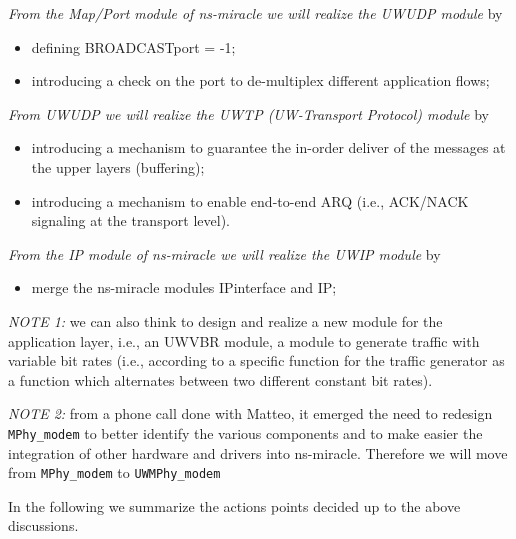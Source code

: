 \documentclass[11pt,journal,draftclsnofoot,onecolumn,twoside,letterpaper]{IEEEtran}
\theoremstyle{definition} \newtheorem{definition}[]{Definition}
\theoremstyle{theorem} \newtheorem{theorem}[]{Theorem}
\begin{document}
{\it From the Map/Port module of ns-miracle we will realize the UWUDP module} by
\begin{itemize}
 \item defining BROADCASTport = -1;
 \item introducing a check on the port to de-multiplex different application flows;
\end{itemize}

{\it From UWUDP we will realize the UWTP (UW-Transport Protocol) module} by
\begin{itemize}
 \item introducing a mechanism to guarantee the in-order deliver of the messages at the upper layers (buffering); 
 \item introducing a mechanism to enable end-to-end ARQ (i.e., ACK/NACK signaling at the transport level).
\end{itemize}

{\it From the IP module of ns-miracle we will realize the UWIP module} by
\begin{itemize}
 \item merge the ns-miracle modules IPinterface and IP;
\end{itemize}

{\it NOTE 1:} we can also think to design and realize a new module for the application layer, i.e., an UWVBR module, a module to generate traffic with variable bit rates (i.e., according to a specific function for the traffic generator as a function which alternates between two different constant bit rates).

{\it NOTE 2:} from a phone call done with Matteo, it emerged the need to redesign {\tt MPhy\_modem} to better identify the various components and to make easier the integration of other hardware and drivers into ns-miracle. Therefore we will move from {\tt MPhy\_modem} to {\tt UWMPhy\_modem} 


In the following we summarize the actions points decided up to the above discussions. 
\end{document}
